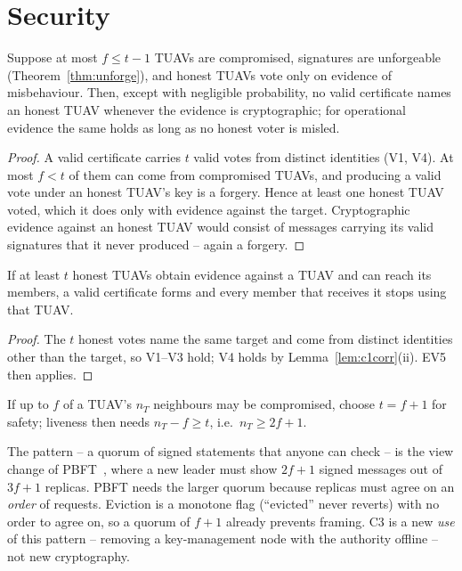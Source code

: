 \section{Security}
\begin{theorem}\label{thm:evsafe}
Suppose at most $f\le t-1$ TUAVs are compromised, signatures are unforgeable (Theorem~\ref{thm:unforge}), and honest TUAVs vote only on evidence of
misbehaviour. Then, except with negligible probability, no valid certificate names an honest TUAV whenever the evidence is cryptographic; for operational
evidence the same holds as long as no honest voter is misled.
\end{theorem}
\begin{proof}
A valid certificate carries $t$ valid votes from distinct identities (V1, V4). At most $f<t$ of them can come from compromised TUAVs, and producing a valid
vote under an honest TUAV's key is a forgery. Hence at least one honest TUAV voted, which it does only with evidence against the target. Cryptographic
evidence against an honest TUAV would consist of messages carrying its valid signatures that it never produced -- again a forgery.
\end{proof}

\begin{theorem}\label{thm:evlive}
If at least $t$ honest TUAVs obtain evidence against a TUAV and can reach its members, a valid certificate forms and every member that receives it stops
using that TUAV.
\end{theorem}
\begin{proof}
The $t$ honest votes name the same target and come from distinct identities other than the target, so V1--V3 hold; V4 holds by
Lemma~\ref{lem:c1corr}(ii). EV5 then applies.
\end{proof}

\begin{corollary}[Choosing $t$]
If up to $f$ of a TUAV's $n_T$ neighbours may be compromised, choose $t=f+1$ for safety; liveness then needs $n_T-f\ge t$, i.e.\ $n_T\ge2f+1$.
\end{corollary}

\begin{remark}
The pattern -- a quorum of signed statements that anyone can check -- is the view change of PBFT~\cite{castro99}, where a new leader must show $2f+1$
signed messages out of $3f+1$ replicas. PBFT needs the larger quorum because replicas must agree on an \emph{order} of requests. Eviction is a monotone
flag (``evicted'' never reverts) with no order to agree on, so a quorum of $f+1$ already prevents framing. C3 is a new \emph{use} of this pattern --
removing a key-management node with the authority offline -- not new cryptography.
\end{remark}

